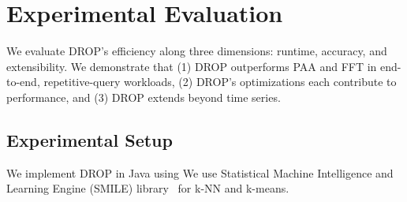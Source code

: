 
\section{Experimental Evaluation}
\label{sec:experiments}

We evaluate DROP's efficiency along three dimensions: runtime, accuracy, and extensibility. We demonstrate that (1) DROP outperforms PAA and FFT in end-to-end, repetitive-query workloads, (2) DROP's optimizations each contribute to performance,  and (3) DROP extends beyond time series.

\subsection{Experimental Setup}
\label{subsec:setup}
 We implement DROP in Java using 
We use  Statistical Machine Intelligence and Learning Engine (SMILE) library~\cite{smile} for k-NN {and k-means}. 

